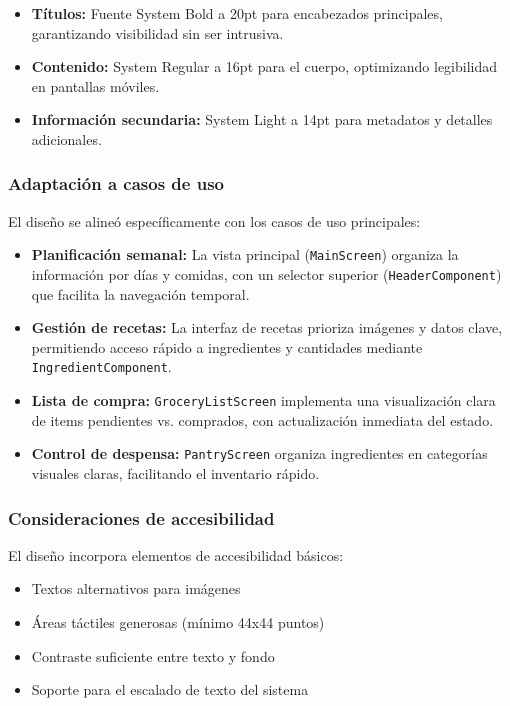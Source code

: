 \documentclass[twoside, openright, 11pt]{report}
\begin{document}
		\begin{itemize}
			\item \textbf{Títulos:} Fuente System Bold a 20pt para encabezados principales, garantizando visibilidad sin ser intrusiva.
			\item \textbf{Contenido:} System Regular a 16pt para el cuerpo, optimizando legibilidad en pantallas móviles.
			\item \textbf{Información secundaria:} System Light a 14pt para metadatos y detalles adicionales.
		\end{itemize}
		
		\subsubsection*{Adaptación a casos de uso}
		El diseño se alineó específicamente con los casos de uso principales:
		
		\begin{itemize}
			\item \textbf{Planificación semanal:} La vista principal (\texttt{MainScreen}) organiza la información por días y comidas, con un selector superior (\texttt{HeaderComponent}) que facilita la navegación temporal.
			
			\item \textbf{Gestión de recetas:} La interfaz de recetas prioriza imágenes y datos clave, permitiendo acceso rápido a ingredientes y cantidades mediante \texttt{IngredientComponent}.
			
			\item \textbf{Lista de compra:} \texttt{GroceryListScreen} implementa una visualización clara de items pendientes vs. comprados, con actualización inmediata del estado.
			
			\item \textbf{Control de despensa:} \texttt{PantryScreen} organiza ingredientes en categorías visuales claras, facilitando el inventario rápido.
		\end{itemize}
		
		\subsubsection*{Consideraciones de accesibilidad}
		El diseño incorpora elementos de accesibilidad básicos:
		
		\begin{itemize}
			\item Textos alternativos para imágenes
			\item Áreas táctiles generosas (mínimo 44x44 puntos)
			\item Contraste suficiente entre texto y fondo
			\item Soporte para el escalado de texto del sistema
		\end{itemize}
		
\end{document}
